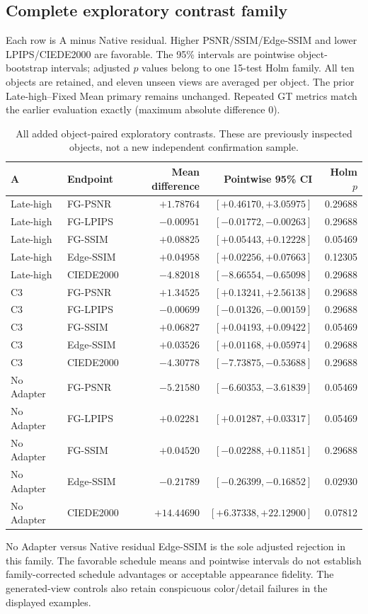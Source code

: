 \documentclass[11pt]{article}
\begin{document}
\subsection*{Complete exploratory contrast family}
Each row is A minus Native residual. Higher PSNR/SSIM/Edge-SSIM and lower LPIPS/CIEDE2000 are favorable. The 95\% intervals are pointwise object-bootstrap intervals; adjusted $p$ values belong to one 15-test Holm family. All ten objects are retained, and eleven unseen views are averaged per object. The prior Late-high--Fixed Mean primary remains unchanged. Repeated GT metrics match the earlier evaluation exactly (maximum absolute difference 0).

\begin{table}[htbp]\centering\scriptsize
\begin{tabular}{llrrr}\toprule A & Endpoint & Mean difference & Pointwise 95\% CI & Holm $p$\\\midrule
Late-high & FG-PSNR & $+1.78764$ & $[+0.46170,+3.05975]$ & 0.29688 \\
Late-high & FG-LPIPS & $-0.00951$ & $[-0.01772,-0.00263]$ & 0.29688 \\
Late-high & FG-SSIM & $+0.08825$ & $[+0.05443,+0.12228]$ & 0.05469 \\
Late-high & Edge-SSIM & $+0.04958$ & $[+0.02256,+0.07663]$ & 0.12305 \\
Late-high & CIEDE2000 & $-4.82018$ & $[-8.66554,-0.65098]$ & 0.29688 \\
C3 & FG-PSNR & $+1.34525$ & $[+0.13241,+2.56138]$ & 0.29688 \\
C3 & FG-LPIPS & $-0.00699$ & $[-0.01326,-0.00159]$ & 0.29688 \\
C3 & FG-SSIM & $+0.06827$ & $[+0.04193,+0.09422]$ & 0.05469 \\
C3 & Edge-SSIM & $+0.03526$ & $[+0.01168,+0.05974]$ & 0.29688 \\
C3 & CIEDE2000 & $-4.30778$ & $[-7.73875,-0.53688]$ & 0.29688 \\
No Adapter & FG-PSNR & $-5.21580$ & $[-6.60353,-3.61839]$ & 0.05469 \\
No Adapter & FG-LPIPS & $+0.02281$ & $[+0.01287,+0.03317]$ & 0.05469 \\
No Adapter & FG-SSIM & $+0.04520$ & $[-0.02288,+0.11851]$ & 0.29688 \\
No Adapter & Edge-SSIM & $-0.21789$ & $[-0.26399,-0.16852]$ & 0.02930 \\
No Adapter & CIEDE2000 & $+14.44690$ & $[+6.37338,+22.12900]$ & 0.07812 \\
\bottomrule\end{tabular}
\caption{All added object-paired exploratory contrasts. These are previously inspected objects, not a new independent confirmation sample.}\end{table}
No Adapter versus Native residual Edge-SSIM is the sole adjusted rejection in this family. The favorable schedule means and pointwise intervals do not establish family-corrected schedule advantages or acceptable appearance fidelity. The generated-view controls also retain conspicuous color/detail failures in the displayed examples.
\end{document}
